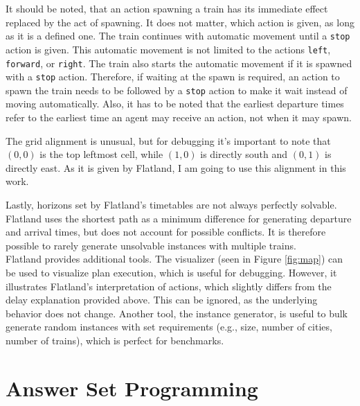 \documentclass{llncs}
\begin{document}
\begin{multicols*}{2}
It should be noted, that an action spawning a train has its immediate effect replaced by the act of spawning. It does not matter, which action is given, as long as it is a defined one. The train continues with automatic movement until a \texttt{stop} action is given. This automatic movement is not limited to the actions \texttt{left}, \texttt{forward}, or \texttt{right}. The train also starts the automatic movement if it is spawned with a \texttt{stop} action. Therefore, if waiting at the spawn is required, an action to spawn the train needs to be followed by a \texttt{stop} action to make it wait instead of moving automatically. Also, it has to be noted that the earliest departure times refer to the earliest time an agent may receive an action, not when it may spawn.

The grid alignment is unusual, but for debugging it's important to note that $(0,0)$ is the top leftmost cell, while $(1,0)$ is directly south and $(0,1)$ is directly east. As it is given by Flatland, I am going to use this alignment in this work.

Lastly, horizons set by Flatland's timetables are not always perfectly solvable. Flatland uses the shortest path as a minimum difference for generating departure and arrival times, but does not account for possible conflicts. It is therefore possible to rarely generate unsolvable instances with multiple trains.\\

Flatland provides additional tools. The visualizer (seen in Figure \ref{fig:map}) can be used to visualize plan execution, which is useful for debugging. However, it illustrates Flatland's interpretation of actions, which slightly differs from the delay explanation provided above. This can be ignored, as the underlying behavior does not change. Another tool, the instance generator, is useful to bulk generate random instances with set requirements (e.g., size, number of cities, number of trains), which is perfect for benchmarks.

\section*{Answer Set Programming}
\begin{figure}[t]
    \begin{minipage}[b]{0.26\textwidth}
        \centering
\end{minipage}
\end{figure}
\end{multicols*}
\end{document}
